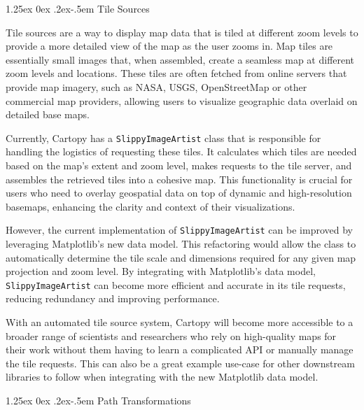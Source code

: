 \documentclass[12pt]{article}
\makeatletter
\numberwithin{page}{section}
\renewcommand{\paragraph}{%
  \@startsection{paragraph}{4}%
  {\z@}{1.25ex \@plus 0ex \@minus .2ex}{-.5em}%
  {\normalfont\normalsize\itshape\bfseries}%
}
\makeatother
\begin{document}
\paragraph{Tile Sources}

Tile sources are a way to display map data that is
tiled at different zoom levels to provide a more detailed view of the map as the user zooms
in. Map tiles are essentially small images that, when assembled, create a seamless map at
different zoom levels and locations. These tiles are often fetched from online servers
that provide map imagery, such as NASA, USGS, OpenStreetMap or other commercial map providers,
allowing users to visualize geographic data overlaid on detailed base maps.

Currently, Cartopy has a \texttt{SlippyImageArtist} class that is responsible for handling the
logistics of requesting these tiles. It calculates which tiles are needed based on the
map's extent and zoom level, makes requests to the tile server, and assembles the retrieved
tiles into a cohesive map. This functionality is crucial for users who need to overlay geospatial
data on top of dynamic and high-resolution basemaps, enhancing the clarity and context of
their visualizations.

However, the current implementation of \texttt{SlippyImageArtist} can be improved by leveraging
Matplotlib's new data model. This refactoring would allow the class to automatically determine
the tile scale and dimensions required for any given map projection and zoom level. By integrating
with Matplotlib's data model, \texttt{SlippyImageArtist} can become more efficient and accurate in
its tile requests, reducing redundancy and improving performance.

With an automated tile source system, Cartopy will become more accessible to a broader range of
scientists and researchers who rely on high-quality maps for their work without them having to learn
a complicated API or manually manage the tile requests. This can also be a great example use-case for other
downstream libraries to follow when integrating with the new Matplotlib data model.

\paragraph{Path Transformations}
\end{document}
